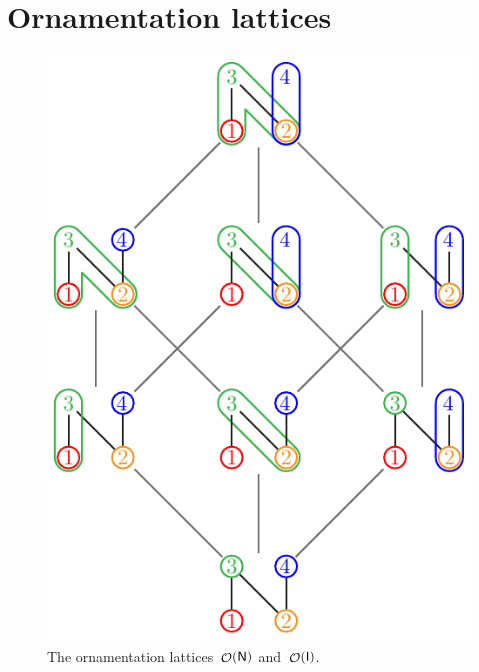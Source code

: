 \documentclass{amsart}
\theoremstyle{definition}
\renewcommand{\c}[1]{\mathcal{#1}} %
\DeclareMathOperator{\Orn}{\c{O}}  %
\newcommand{\Igraph}{\sf I} %
\newcommand{\Ngraph}{\sf N} %
\begin{document}

\newpage
\section{Ornamentation lattices}

\begin{figure}
	\centerline{\includegraphics[scale=.8]{ornamentationsN} \qquad {}}
	\caption{The ornamentation lattices~$\Orn(\Ngraph)$ and~$\Orn(\Igraph)$.}
	\label{fig:ornamentationsNI}
\end{figure}
\end{document}
